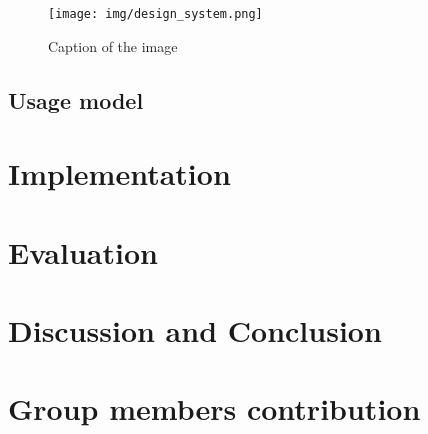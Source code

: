 \documentclass[11pt]{report}
\begin{document}
\begin{figure}[htbp]
  \centering
  \texttt{[image: img/design\_system.png]}
  \caption{Caption of the image}
  \label{fig:image_label}
\end{figure}
\subsection*{Usage model}

\section*{Implementation}

\section*{Evaluation}

\section*{Discussion and Conclusion}

\section*{Group members contribution}

\newpage
\printbibliography
{}
\end{document}
